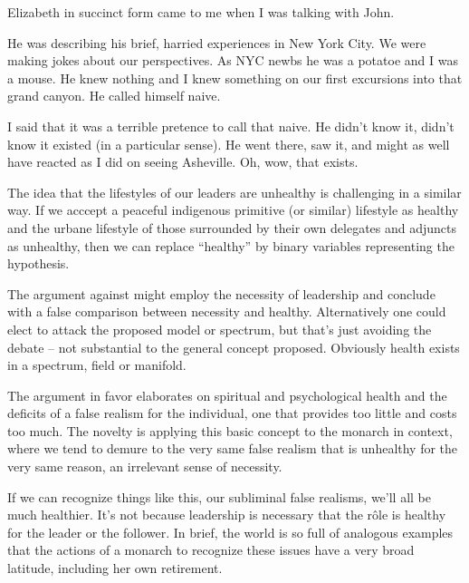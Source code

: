 

Elizabeth in succinct form came to me when I was talking with John.

He was describing his brief, harried experiences in New York City.  We
were making jokes about our perspectives.  As NYC newbs he was a
potatoe and I was a mouse.  He knew nothing and I knew something on
our first excursions into that grand canyon.  He called himself naive.

I said that it was a terrible pretence to call that naive.  He didn't
know it, didn't know it existed (in a particular sense).  He went
there, saw it, and might as well have reacted as I did on seeing
Asheville.  Oh, wow, that exists.  

The idea that the lifestyles of our leaders are unhealthy is
challenging in a similar way.  If we acccept a peaceful indigenous
primitive (or similar) lifestyle as healthy and the urbane lifestyle
of those surrounded by their own delegates and adjuncts as unhealthy,
then we can replace ``healthy'' by binary variables representing the
hypothesis.

The argument against might employ the necessity of leadership and
conclude with a false comparison between necessity and healthy.
Alternatively one could elect to attack the proposed model or
spectrum, but that's just avoiding the debate -- not substantial to
the general concept proposed.  Obviously health exists in a spectrum,
field or manifold.

The argument in favor elaborates on spiritual and psychological health
and the deficits of a false realism for the individual, one that
provides too little and costs too much.  The novelty is applying this
basic concept to the monarch in context, where we tend to demure to
the very same false realism that is unhealthy for the very same
reason, an irrelevant sense of necessity.

If we can recognize things like this, our subliminal false realisms,
we'll all be much healthier.  It's not because leadership is necessary
that the r\^ole is healthy for the leader or the follower.  In brief,
the world is so full of analogous examples that the actions of a
monarch to recognize these issues have a very broad latitude,
including her own retirement.

\bye
